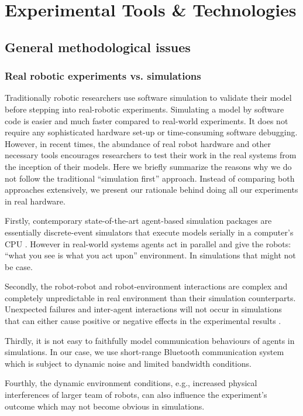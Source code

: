\chapter{Experimental Tools \& Technologies}
\label{expt-tools}
\section{General methodological issues}
\subsection{Real robotic experiments vs. simulations}
Traditionally robotic researchers use software simulation to validate their model before stepping into real-robotic experiments. Simulating a model by software code is easier and much faster compared to real-world experiments. It does not require any sophisticated hardware set-up or time-consuming software debugging. However, in recent times, the abundance of real robot hardware and other necessary tools encourages researchers to test their work in the real systems from the inception of their models. Here we briefly summarize the reasons why we do not follow the traditional ``simulation first'' approach. Instead of comparing both approaches extensively, we present our rationale behind doing all our experiments in real hardware.

Firstly, contemporary state-of-the-art agent-based simulation packages are essentially discrete-event simulators that execute models serially in a computer's CPU \cite{Lysenko+2008}. However in real-world systems agents act in parallel and give the robots:  ``what you see is what you act upon'' environment. In simulations that might not be case.

Secondly, the robot-robot and robot-environment interactions are complex and completely unpredictable in real environment than their simulation counterparts. Unexpected failures and inter-agent interactions will not occur in simulations that can either cause positive or negative effects in the experimental results \cite{Krieger+2000}.

Thirdly, it is not easy to faithfully model communication behaviours of agents in simulations. In our case, we use short-range Bluetooth communication system which is subject to dynamic noise and limited bandwidth conditions.

Fourthly, the dynamic environment conditions, e.g., increased physical interferences of larger team of robots, can also influence the experiment's outcome which may not become obvious in simulations.

